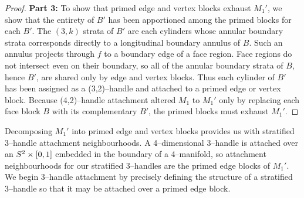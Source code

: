 \begin{proof}
	

	

	\textbf{Part 3:}
	To show that primed edge and vertex blocks exhaust $M_1'$, we show that the entirety of $B'$ has been apportioned among the primed blocks for each $B'$.
	The $(3,k)$ strata of $B'$ are each cylinders whose annular boundary strata corresponds directly to a longitudinal boundary annulus of $B$.
	Such an annulus projects through $f$ to a boundary edge of a face region.
	Face regions do not intersect even on their boundary, so all of the annular boundary strata of $B$, hence $B'$, are shared only by edge and vertex blocks.
	Thus each cylinder of $B'$ has been assigned as a (3,2)--handle and attached to a primed edge or vertex block.
	Because (4,2)--handle attachment altered $M_1$ to $M_1'$ only by replacing each face block $B$ with its complementary $B'$, the primed blocks must exhaust $M_1'$.
\end{proof}

Decomposing $M_1'$ into primed edge and vertex blocks provides us with stratified 3--handle attachment neighbourhoods.
A 4--dimensional 3--handle is attached over an $S^2\times[0,1]$ embedded in the boundary of a 4--manifold, so attachment neighbourhoods for our stratified 3--handles are the primed edge blocks of $M_1'$.
We begin 3--handle attachment by precisely defining the structure of a stratified 3--handle so that it may be attached over a primed edge block.

